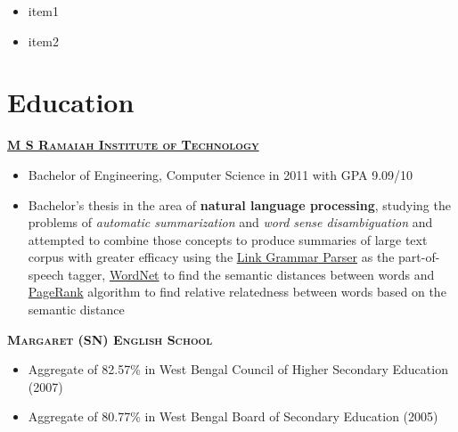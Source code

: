 \documentclass{article}
\begin{document}
\begin{itemize}[noitemsep,nolistsep]
	\item item1
	\item item2
\end{itemize}

\section{Education}
{\raggedright{\textsc{\textbf{\href{http://www.msrit.edu}{M S Ramaiah Institute of Technology}}}}} \hfill {}

\begin{itemize}[noitemsep,nolistsep]
\item Bachelor of Engineering, Computer Science in 2011 with GPA 9.09/10
\item Bachelor’s thesis in the area of \textbf{natural language processing}, studying the problems of \textit{automatic summarization} and \textit{word sense disambiguation} and attempted to combine those concepts to produce summaries of large text corpus with greater efficacy using the \href{https://www.link.cs.cmu.edu/link/}{Link Grammar Parser} as the part-of-speech tagger, \href{https://wordnet.princeton.edu/}{WordNet} to find the semantic distances between words and \href{https://en.wikipedia.org/wiki/PageRank}{PageRank} algorithm to find relative relatedness between words based on the semantic distance
\end{itemize}


{\raggedright{\textsc{\textbf{Margaret (SN) English School}}}} \hfill {}
\begin{itemize}[noitemsep,nolistsep]
\item Aggregate of 82.57\% in West Bengal Council of Higher Secondary Education (2007)
\item Aggregate of 80.77\% in West Bengal Board of Secondary Education (2005)
\end{itemize}
\end{document}
